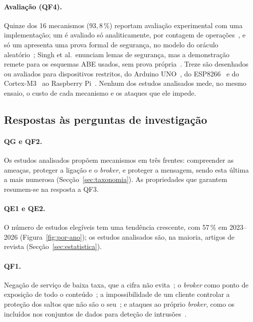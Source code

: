 \paragraph{Avaliação (QF4).} Quinze dos 16 mecanismos ($93{,}8\,\%$) reportam
avaliação experimental com uma implementação; um é avaliado só analiticamente, por
contagem de operações~\cite{malina2019secure}, e só um apresenta
uma prova formal de segurança, no modelo do oráculo aleatório~\cite{javadi2026cmap};
Singh et al.\ enunciam lemas de segurança, mas a demonstração remete para os
esquemas ABE usados, sem prova própria~\cite[§VI]{singh2015secure}. Treze são desenhados ou
avaliados para dispositivos restritos, do Arduino UNO~\cite{sadio2019lightweight},
do ESP8266~\cite{spielvogel2021tls, prantl2021performance} e do
Cortex-M3~\cite{dahlmanns2021entrust} ao Raspberry Pi~\cite{segarra2020mqttz,
javadi2026cmap}. Nenhum dos estudos analisados mede, no mesmo ensaio, o custo de cada mecanismo e os
ataques que ele impede.

\subsection{Respostas às perguntas de investigação}
\label{sec:respostas}

\paragraph{QG e QF2.} Os estudos analisados propõem mecanismos em três frentes:
compreender as ameaças, proteger a ligação e o \emph{broker}, e proteger a
mensagem, sendo esta última a mais numerosa (Secção~\ref{sec:taxonomia}). As
propriedades que garantem resumem-se na resposta a QF3.

\paragraph{QE1 e QE2.} O número de estudos elegíveis tem uma tendência crescente,
com 57\,\% em 2023--2026 (Figura~\ref{fig:por-ano}); os estudos analisados são, na
maioria, artigos de revista (Secção~\ref{sec:estatistica}).

\paragraph{QF1.} Negação de serviço de baixa taxa, que a cifra não
evita~\cite{vaccari2020slowite}; o \emph{broker} como ponto de exposição de todo o
conteúdo~\cite{segarra2020mqttz, dahlmanns2021entrust}; a impossibilidade de um
cliente controlar a proteção dos saltos que não são o seu~\cite{spielvogel2021tls};
e ataques ao próprio \emph{broker}, como os incluídos nos conjuntos de dados para
deteção de intrusões~\cite{vaccari2020mqttset, alotaibi2024secure}.

